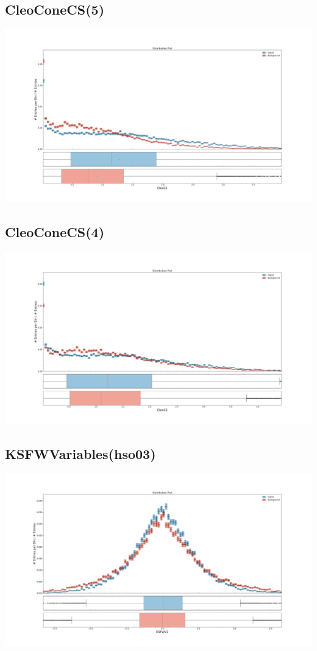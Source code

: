 \documentclass[10pt,a4paper]{article}
\begin{document}
\subsection{CleoConeCS(5)}
\begin{center}
\includegraphics[width=1.0\textwidth]{variable_778029149871980981.pdf}
\end{center}
\subsection{CleoConeCS(4)}
\begin{center}
\includegraphics[width=1.0\textwidth]{variable_4516798101877542690.pdf}
\end{center}
\subsection{KSFWVariables(hso03)}
\begin{center}
\includegraphics[width=1.0\textwidth]{variable_-1735257035510540498.pdf}
\end{center}
\end{document}
